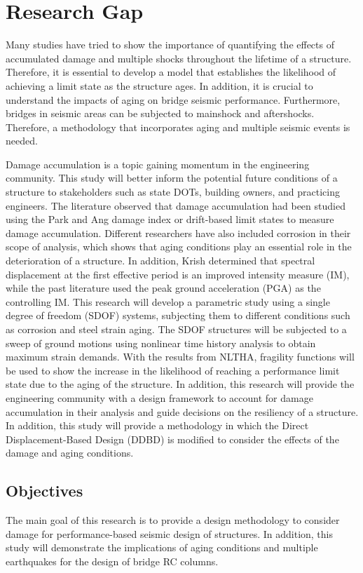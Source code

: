 \section{Research Gap}

Many studies have tried to show the importance of quantifying the effects of accumulated damage and multiple shocks throughout the lifetime of a structure. Therefore, it is essential to develop a model that establishes the likelihood of achieving a limit state as the structure ages. In addition,  it is crucial to understand the impacts of aging on bridge seismic performance. Furthermore, bridges in seismic areas can be subjected to mainshock and aftershocks. Therefore, a methodology that incorporates aging and multiple seismic events is needed.

Damage accumulation is a topic gaining momentum in the engineering community. This study will better inform the potential future conditions of a structure to stakeholders such as state DOTs, building owners, and practicing engineers. The literature observed that damage accumulation had been studied using the Park and Ang damage index or drift-based limit states to measure damage accumulation. Different researchers have also included corrosion in their scope of analysis, which shows that aging conditions play an essential role in the deterioration of a structure. In addition, Krish \cite{Krish2018} determined that spectral displacement at the first effective period is an improved intensity measure (IM), while the past literature used the peak ground acceleration (PGA) as the controlling IM. This research will develop a parametric study using a single degree of freedom (SDOF) systems, subjecting them to different conditions such as corrosion and steel strain aging. The SDOF structures will be subjected to a sweep of ground motions using nonlinear time history analysis to obtain maximum strain demands. With the results from NLTHA, fragility functions will be used to show the increase in the likelihood of reaching a performance limit state due to the aging of the structure. In addition, this research will provide the engineering community with a design framework to account for damage accumulation in their analysis and guide decisions on the resiliency of a structure. In addition, this study will provide a methodology in which the Direct Displacement-Based Design (DDBD) is modified to consider the effects of the damage and aging conditions.

\subsection{Objectives}
The main goal of this research is to provide a design methodology to consider damage for performance-based seismic design of structures. In addition, this study will demonstrate the implications of aging conditions and multiple earthquakes for the design of bridge RC columns.


